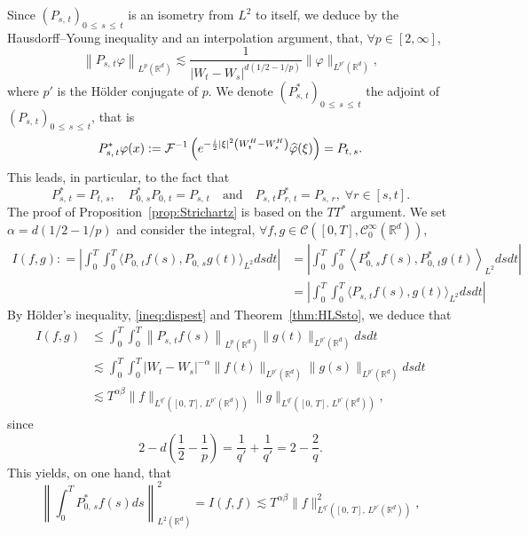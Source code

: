 \documentclass[10pt]{amsart}
\theoremstyle{definition}\newtheorem{defi}[theo]{Definition}\newtheorem{rema}[theo]{Remark}\newtheorem{exam}[theo]{Example}\newtheorem{exem}[theo]{Example}\newtheorem{nota}[theo]{Notation}
\newcommand{\bbR}{\mathbb{R}}
\newcommand{\clC}{\mathcal{C}}
\newcommand{\clF}{\mathcal{F}}
\let\oldhat\hat
\renewcommand*{\hat}[1]{\mathchoice{\widehat{#1}}{\widehat{#1}}{\oldhat{#1}}{\oldhat{#1}}}
\let\oldforall\forall
\renewcommand*{\forall}{\mathrel{\oldforall}}
\begin{document}
Since $(P_{s,\,t})_{0\,\leq\,s\,\leq\,t}$ is an isometry from $L^2$ to itself, we deduce by the Hausdorff--Young inequality and an interpolation argument, that, $\forall p\in [2,\infty]$,
\begin{equation}\label{ineq:dispest}
\left\|P_{s,\,t}\varphi\right\|_{L^p\left(\bbR^d\right)} \lesssim \frac{1}{\left|W_t-W_s\right|^{d\left(1/2-1/p\right)}} \|\varphi\|_{L^{p'}\left(\bbR^d\right)},
\end{equation}
where $p'$ is the H\"older conjugate of $p$. We denote $(P_{s,\,t}^*)_{0\,\leq\,s\,\leq\,t}$ the adjoint of $(P_{s,\,t})_{0\,\leq\,s\,\leq\,t}$, that is
\[
P^*_{s,\,t}\varphi(x) : = \clF^{-1}\left(e^{-\frac{i}2 |\xi|^2\left(W_t^H-W_s^H\right)} \hat{\varphi}(\xi)\right) = P_{t,\,s}.
\]
This leads, in particular, to the fact that
\[
P^*_{s,\,t} = P_{t,\,s},\quad P_{0,\,s}^*P_{0,\,t} = P_{s,\,t}\quad\text{and}\quad P_{s,\,t}P^*_{r,\,t} = P_{s,\,r},\; \forall r\in[s,t].
\]
The proof of Proposition~\ref{prop:Strichartz} is based on the $TT^*$ argument. We set $\alpha = d(1/2-1/p)$ and consider the integral, $\forall f,g\in \clC([0,T], \clC^{\infty}_0(\bbR^d))$,
\begin{align*}
I(f,g) : = \left| \int_0^T\int_0^T \big\langle P_{0,\,t} f(s), P_{0,\,s} g(t)\big\rangle_{L^2} ds dt \right| &= \left| \int_0^T\int_0^T \left\langle P_{0,\,s}^* f(s), P_{0,\,t}^*g(t)\right\rangle_{L^2} ds dt \right|
\\
&= \left| \int_0^T\int_0^T \big\langle P_{s,\,t} f(s), g(t)\big\rangle_{L^2} ds dt \right|
\end{align*}
By H\"older's inequality, \eqref{ineq:dispest} and Theorem~\ref{thm:HLSsto}, we deduce that
\begin{align*}
I(f,g) &\leq \int_0^T\int_0^T \left\|P_{s,\,t}f(s)\right\|_{L^{p}\left(\bbR^d\right)}\|g(t)\|_{L^{p'}\left(\bbR^d\right)} ds dt\\
&\lesssim\int_0^T\int_0^T \left|W_t-W_s\right|^{-\alpha}\|f(t)\|_{L^{p'}\left(\bbR^d\right)}\|g(s)\|_{L^{p'}\left(\bbR^d\right)} ds dt\\
&\lesssim T^{\alpha\beta} \|f\|_{L^{q'}\left([0,\,T],\,L^{p'}\left(\bbR^d\right)\right)}\|g\|_{L^{q'}\left([0,\,T],\,L^{p'}\left(\bbR^d\right)\right)},
\end{align*}
since
\[
2 - d\left(\frac12-\frac1p\right) = \frac 1{q'} + \frac1{q'} = 2 - \frac{2}{q}.
\]
This yields, on one hand, that
\begin{equation}\label{eq:StriHomoDual}
\left\|\int_0^T P_{0,\,s}^* f(s) ds \right\|_{L^2\left(\bbR^d\right)}^2 = I(f,f) \lesssim T^{\alpha\beta} \|f\|_{L^{q'}\left([0,\,T],\,L^{p'}\left(\bbR^d\right)\right)}^2,
\end{equation}
\end{document}
